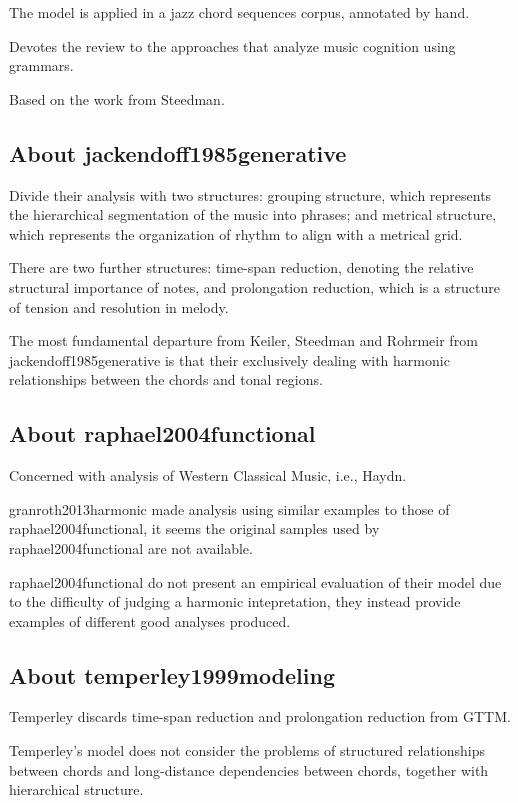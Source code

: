   The model is applied in a jazz chord sequences corpus, annotated by hand.

  Devotes the review to the approaches that analyze music cognition using grammars.

  Based on the work from Steedman.

  \subsection{About jackendoff1985generative}
    Divide their analysis with two structures: grouping structure, which represents the hierarchical segmentation of the music into phrases; and metrical structure, which represents the organization of rhythm to align with a metrical grid.

    There are two further structures: time-span reduction, denoting the relative structural importance of notes, and prolongation reduction, which is a structure of tension and resolution in melody.

    The most fundamental departure from Keiler, Steedman and Rohrmeir from jackendoff1985generative is that their exclusively dealing with harmonic relationships between the chords and tonal regions.

  \subsection{About raphael2004functional}
    Concerned with analysis of Western Classical Music, i.e., Haydn.

    granroth2013harmonic made analysis using similar examples to those of raphael2004functional, it seems the original samples used by raphael2004functional are not available.

    raphael2004functional do not present an empirical evaluation of their model due to the difficulty of judging a harmonic intepretation, they instead provide examples of different good analyses produced.

  \subsection{About temperley1999modeling}
    Temperley discards time-span reduction and prolongation reduction from GTTM.

    Temperley's model does not consider the problems of structured relationships between chords and long-distance dependencies between chords, together with hierarchical structure.

